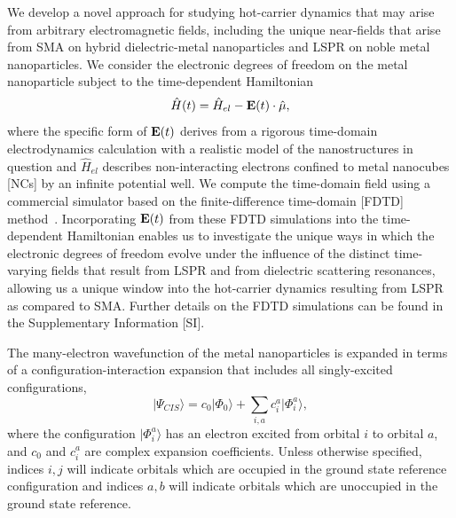 \documentclass[journal=jpclcd,manuscript=letter]{achemso}
\begin{document}
We develop a novel approach for studying hot-carrier dynamics that may arise from arbitrary electromagnetic
fields, including the unique near-fields that arise from SMA on hybrid dielectric-metal nanoparticles and LSPR
on noble metal nanoparticles.
We consider the electronic degrees of freedom on the metal nanoparticle subject to the time-dependent Hamiltonian 
\begin{equation}\label{eq:TDHam}
\hat{H}(t) = \hat{H}_{el} - {\bf E}(t) \cdot \hat{\mu}, 
\end{equation}
where the specific form of ${\bf E}(t)$ derives from a rigorous time-domain electrodynamics calculation with a realistic model
of the nanostructures in question and $\hat{H}_{el}$ describes non-interacting electrons confined to metal nanocubes [NCs] by an infinite potential well.  
We compute the time-domain field 
using a commercial simulator based on the finite-difference time-domain [FDTD] method~\cite{Lumerical}.  
Incorporating  ${\bf E}(t)$ from these FDTD simulations into the time-dependent Hamiltonian enables us to investigate the unique ways
in which the electronic degrees of freedom evolve under the influence of the distinct time-varying fields that result
from LSPR and from dielectric scattering resonances, allowing us a unique window into the hot-carrier dynamics resulting from LSPR as compared
to SMA.  Further details on the FDTD simulations can be found in the Supplementary Information [SI]. 

The many-electron wavefunction of the metal nanoparticles is expanded in terms of a configuration-interaction expansion that
includes all singly-excited configurations,
\begin{equation}\label{eq:CIS}
|\Psi_{CIS}\rangle = c_0 |\Phi_0 \rangle + \sum_{i,a} c_i^a |\Phi_i^a\rangle,
\end{equation}
where the configuration $|\Phi_i^a\rangle$ has an electron excited from orbital $i$ to orbital $a$, 
and $c_0$ and $c_i^a$ are complex expansion coefficients.  Unless otherwise specified, indices $i, j$ will indicate
orbitals which are occupied in the ground state reference configuration and indices $a, b$ will indicate orbitals
which are unoccupied in the ground state reference.  
\end{document}
